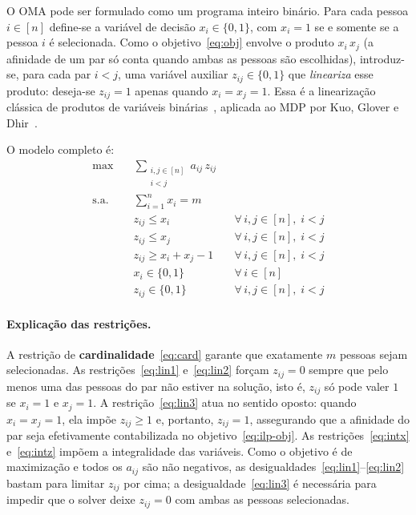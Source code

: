 \documentclass[a4paper,11pt]{article}
\begin{document}
O OMA pode ser formulado como um programa inteiro binário. Para cada pessoa
$i \in [n]$ define-se a variável de decisão $x_i \in \{0,1\}$, com $x_i = 1$ se e somente
se a pessoa $i$ é selecionada. Como o objetivo~\eqref{eq:obj} envolve o produto
$x_i\,x_j$ (a afinidade de um par só conta quando ambas as pessoas são escolhidas),
introduz-se, para cada par $i < j$, uma variável auxiliar $z_{ij} \in \{0,1\}$ que
\emph{lineariza} esse produto: deseja-se $z_{ij} = 1$ apenas quando $x_i = x_j = 1$. Essa
é a linearização clássica de produtos de variáveis binárias~\cite{glover1974converting},
aplicada ao MDP por Kuo, Glover e Dhir~\cite{kuo1993analyzing}.

O modelo completo é:
\begin{align}
  \max \quad & \sum_{\substack{i,j \in [n] \\ i < j}} a_{ij}\, z_{ij} \label{eq:ilp-obj}\\
  \text{s.a.} \quad
    & \sum_{i=1}^{n} x_i = m \label{eq:card}\\
    & z_{ij} \leq x_i & & \forall\, i,j \in [n],\; i < j \label{eq:lin1}\\
    & z_{ij} \leq x_j & & \forall\, i,j \in [n],\; i < j \label{eq:lin2}\\
    & z_{ij} \geq x_i + x_j - 1 & & \forall\, i,j \in [n],\; i < j \label{eq:lin3}\\
    & x_i \in \{0,1\} & & \forall\, i \in [n] \label{eq:intx}\\
    & z_{ij} \in \{0,1\} & & \forall\, i,j \in [n],\; i < j \label{eq:intz}
\end{align}

\paragraph{Explicação das restrições.}
A restrição de \textbf{cardinalidade}~\eqref{eq:card} garante que exatamente $m$ pessoas
sejam selecionadas. As restrições~\eqref{eq:lin1} e~\eqref{eq:lin2} forçam $z_{ij} = 0$
sempre que pelo menos uma das pessoas do par não estiver na solução, isto é, $z_{ij}$ só
pode valer $1$ se $x_i = 1$ e $x_j = 1$. A restrição~\eqref{eq:lin3} atua no sentido
oposto: quando $x_i = x_j = 1$, ela impõe $z_{ij} \geq 1$ e, portanto, $z_{ij} = 1$,
assegurando que a afinidade do par seja efetivamente contabilizada no
objetivo~\eqref{eq:ilp-obj}. As restrições~\eqref{eq:intx} e~\eqref{eq:intz} impõem a
integralidade das variáveis. Como o objetivo é de maximização e todos os $a_{ij}$ são não
negativos, as desigualdades~\eqref{eq:lin1}--\eqref{eq:lin2} bastam para limitar
$z_{ij}$ por cima; a desigualdade~\eqref{eq:lin3} é necessária para impedir que o solver
deixe $z_{ij} = 0$ com ambas as pessoas selecionadas.
\end{document}
